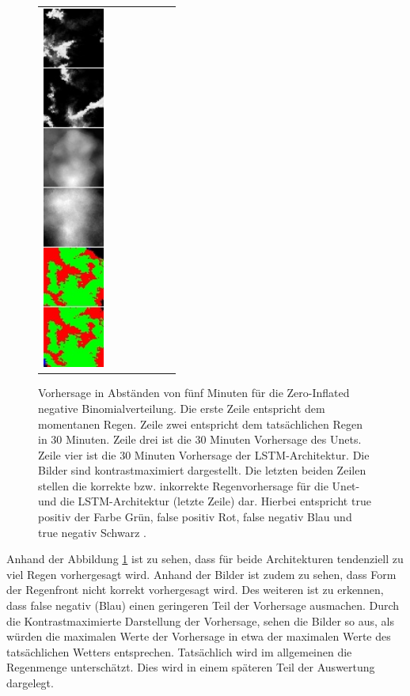 \begin{figure}[h]
\begin{tabular}{lllllll}
\includegraphics[width=20mm]{abb/prediction/106_maxCont}
\end{tabular}
\caption{Vorhersage in Abständen von fünf Minuten für die Zero-Inflated negative Binomialverteilung. Die erste Zeile entspricht dem momentanen Regen. Zeile zwei entspricht dem tatsächlichen Regen in 30 Minuten. Zeile drei ist die 30 Minuten Vorhersage des Unets. Zeile vier ist die 30 Minuten Vorhersage der LSTM-Architektur. Die Bilder sind kontrastmaximiert dargestellt. Die letzten beiden Zeilen stellen die korrekte bzw. inkorrekte Regenvorhersage für die Unet- und die LSTM-Architektur (letzte Zeile) dar.
Hierbei entspricht true positiv der Farbe Grün, false positiv Rot, false negativ Blau und true negativ Schwarz .\label{fig:predNegBin}}
\end{figure}

\noindent Anhand der Abbildung \ref{fig:predNegBin} ist zu sehen, dass für beide Architekturen tendenziell zu viel Regen vorhergesagt wird. Anhand der Bilder ist zudem zu sehen, dass Form der Regenfront nicht korrekt vorhergesagt wird. Des weiteren ist zu erkennen, dass false negativ (Blau) einen geringeren Teil der Vorhersage ausmachen. Durch die Kontrastmaximierte Darstellung der Vorhersage, sehen die Bilder so aus, als würden die maximalen Werte der Vorhersage in etwa der maximalen Werte des tatsächlichen Wetters entsprechen. Tatsächlich wird im allgemeinen die Regenmenge unterschätzt. Dies wird in einem späteren Teil der Auswertung dargelegt.\\



